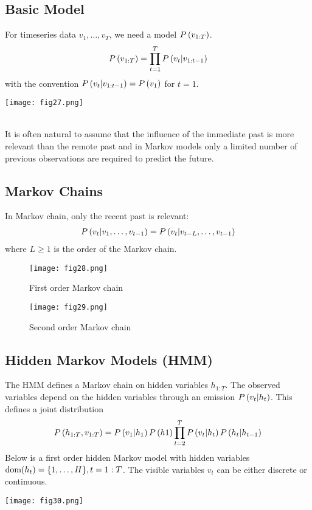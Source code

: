 \subsection{Basic Model}

\begin{minipage}{0.6\textwidth}
	For timeseries data $v_1,\dotsc,v_T$, we need a model $\P{v_{1:T}}$.
	\begin{align*}
		\P{v_{1:T}}=\prod_{t=1}^T\P{v_t|v_{1:t-1}}
	\end{align*}
	with the convention $\P{v_t|v_{1:t-1}}=\P{v_1}$ for $t=1$.
\end{minipage}
\begin{minipage}{0.4\textwidth}
	\centering
	\texttt{[image: fig27.png]}
\end{minipage}
\\

It is often natural to assume that the influence of the immediate past is more relevant than the remote past and in Markov models only a limited number of previous observations are required to predict the future.

\subsection{Markov Chains}

In Markov chain, only the recent past is relevant:
\begin{align*}
	\P{v_t|v_1,\dotsc,v_{t-1}}=\P{v_t|v_{t-L},\dotsc,v_{t-1}}
\end{align*}
where $L\geq 1$ is the order of the Markov chain.
\begin{figure*}[h]
	\centering
	\begin{subfigure}[b]{0.45\textwidth}
		\centering
		\texttt{[image: fig28.png]}
		\caption*{First order Markov chain}
	\end{subfigure}
	\begin{subfigure}[b]{0.45\textwidth}
		\centering
		\texttt{[image: fig29.png]}
		\caption*{Second order Markov chain}
	\end{subfigure}
\end{figure*}

\subsection{Hidden Markov Models (HMM)}

The HMM defines a Markov chain on hidden variables $h_{1:T}$. The observed variables depend on the hidden variables through an emission $\P{v_t|h_t}$. This defines a joint distribution
\begin{align*}
	\P{h_{1:T},v_{1:T}}=\P{v_1|h_1}\P{h1}\prod_{t=2}^T\P{v_t|h_t}\P{h_t|h_{t-1}}
\end{align*}
Below is a first order hidden Markov model with hidden variables $\dom(h_t)=\{1,\dotsc,H\},t=1:T$. The visible variables $v_t$ can be either discrete or continuous.
\begin{figure*}[h]
	\centering
	\texttt{[image: fig30.png]}
\end{figure*}



